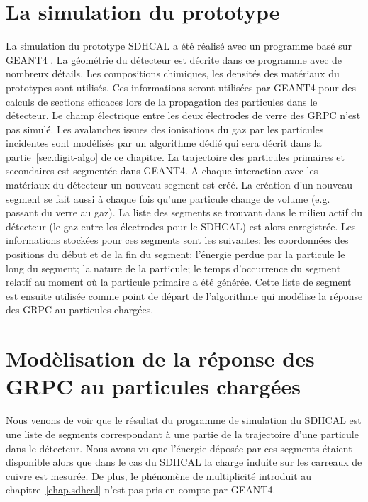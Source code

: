 \section{La simulation du prototype}
La simulation du prototype SDHCAL a été réalisé avec un programme basé sur GEANT4 \cite{geant4}. La géométrie du détecteur est décrite dans ce programme avec de nombreux détails. Les compositions chimiques, les densités des matériaux du prototypes sont utilisés. Ces informations seront utilisées par GEANT4 pour des calculs de sections efficaces lors de la propagation des particules dans le détecteur. Le champ électrique entre les deux électrodes de verre des GRPC n'est pas simulé. Les avalanches issues des ionisations du gaz par les particules incidentes sont modélisés par un algorithme dédié qui sera décrit dans la partie~\ref{sec.digit-algo} de ce chapitre. La trajectoire des particules primaires et secondaires est segmentée dans GEANT4. A chaque interaction avec les matériaux du détecteur un nouveau segment est créé. La création d'un nouveau segment se fait aussi à chaque fois qu'une particule change de volume (e.g. passant du verre au gaz). La liste des segments se trouvant dans le milieu actif du détecteur (le gaz entre les électrodes pour le SDHCAL) est alors enregistrée. Les informations stockées pour ces segments sont les suivantes: les coordonnées des positions du début et de la fin du segment; l'énergie perdue par la particule le long du segment; la nature de la particule; le temps d’occurrence du segment relatif au moment où la particule primaire a été générée. 
Cette liste de segment est ensuite utilisée comme point de départ de l’algorithme qui modélise la réponse des GRPC au particules chargées.


\section{Modèlisation de la réponse des GRPC au particules chargées}
Nous venons de voir que le résultat du programme de simulation du SDHCAL est une liste de segments correspondant à une partie de la trajectoire d'une particule dans le détecteur. Nous avons vu que l'énergie déposée par ces segments étaient disponible alors que dans le cas du SDHCAL la charge induite sur les carreaux de cuivre est mesurée. De plus, le phénomène de multiplicité introduit au chapitre~\ref{chap.sdhcal} n'est pas pris en compte par GEANT4. 
\label{sec.digit-algo}

